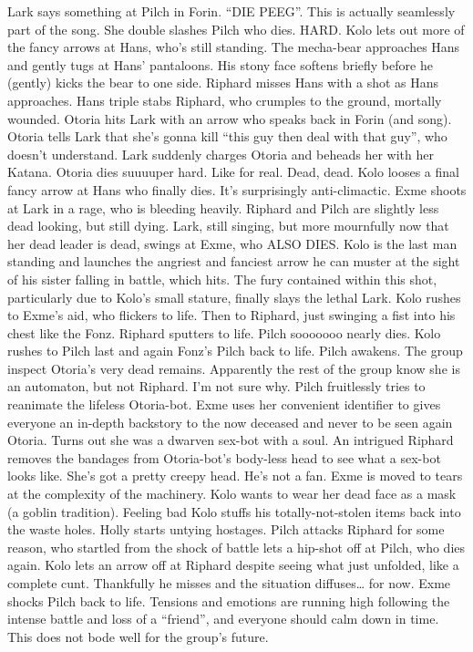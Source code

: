 Lark says something at Pilch in Forin. “DIE PEEG”. This is actually seamlessly part of the song. She double slashes Pilch who dies. HARD.\medskip
Kolo lets out more of the fancy arrows at Hans, who’s still standing.\medskip
The mecha-bear approaches Hans and gently tugs at Hans’ pantaloons. His stony face softens briefly before he (gently) kicks the bear to one side.\medskip
Riphard misses Hans with a shot as Hans approaches. Hans triple stabs Riphard, who crumples to the ground, mortally wounded.\medskip
Otoria hits Lark with an arrow who speaks back in Forin (and song). Otoria tells Lark that she’s gonna kill “this guy then deal with that guy”, who doesn’t understand. Lark suddenly charges Otoria and beheads her with her Katana. Otoria dies suuuuper hard. Like for real. Dead, dead.\medskip
Kolo looses a final fancy arrow at Hans who finally dies. It’s surprisingly anti-climactic.\medskip
Exme shoots at Lark in a rage, who is bleeding heavily.\medskip
Riphard and Pilch are slightly less dead looking, but still dying.\medskip
Lark, still singing, but more mournfully now that her dead leader is dead, swings at Exme, who ALSO DIES.\medskip
Kolo is the last man standing and launches the angriest and fanciest arrow he can muster at the sight of his sister falling in battle, which hits. The fury contained within this shot, particularly due to Kolo’s small stature, finally slays the lethal Lark.\medskip
Kolo rushes to Exme’s aid, who flickers to life. Then to Riphard, just swinging a fist into his chest like the Fonz. Riphard sputters to life.\medskip
Pilch sooooooo nearly dies. Kolo rushes to Pilch last and again Fonz’s Pilch back to life. Pilch awakens.\medskip
The group inspect Otoria’s very dead remains. Apparently the rest of the group know she is an automaton, but not Riphard. I’m not sure why.\medskip
Pilch fruitlessly tries to reanimate the lifeless Otoria-bot.\medskip
Exme uses her convenient identifier to gives everyone an in-depth backstory to the now deceased and never to be seen again Otoria. Turns out she was a dwarven sex-bot with a soul.\medskip
An intrigued Riphard removes the bandages from Otoria-bot’s body-less head to see what a sex-bot looks like. She’s got a pretty creepy head. He’s not a fan.\medskip
Exme is moved to tears at the complexity of the machinery. Kolo wants to wear her dead face as a mask (a goblin tradition).\medskip
Feeling bad Kolo stuffs his totally-not-stolen items back into the waste holes.\medskip
Holly starts untying hostages.\medskip
Pilch attacks Riphard for some reason, who startled from the shock of battle lets a hip-shot off at Pilch, who dies again. Kolo lets an arrow off at Riphard despite seeing what just unfolded, like a complete cunt. Thankfully he misses and the situation diffuses… for now. Exme shocks Pilch back to life. Tensions and emotions are running high following the intense battle and loss of a “friend”, and everyone should calm down in time. This does not bode well for the group’s future.\medskip
